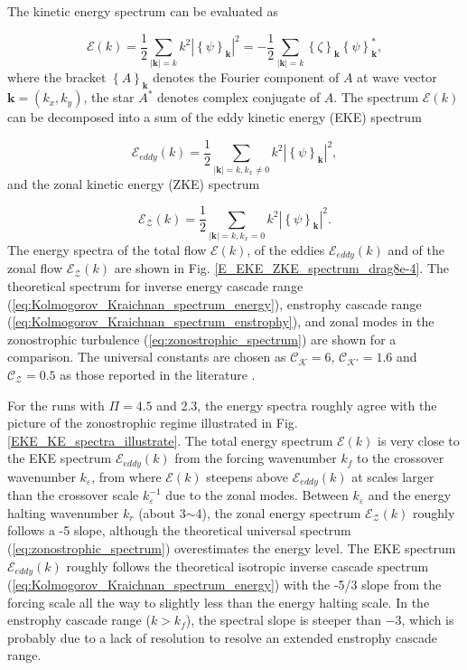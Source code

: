 \documentclass{ametsoc}
\begin{document}
The kinetic energy spectrum can be evaluated as

\begin{equation}
\mathcal{E}(k)=\frac{1}{2}\underset{|\mathbf{k}|=k}{\sum}k^{2}|\left\{ \psi\right\} _{\mathbf{k}}|^{2}=-\frac{1}{2}\underset{|\mathbf{k}|=k}{\sum}\left\{ \zeta\right\} _{\mathbf{k}}\left\{ \psi\right\} _{\mathbf{k}}^{*},\label{eq:energy_spectrum_psi_zeta}
\end{equation}
where the bracket $\left\{ A\right\} _{\mathbf{k}}$ denotes the Fourier
component of $A$ at wave vector $\mathbf{k}=(k_{x},k_{y})$, the
star $A^{*}$ denotes complex conjugate of $A$. The spectrum $\mathcal{E}(k)$
can be decomposed into a sum of the eddy kinetic energy (EKE) spectrum

\begin{equation}
\mathcal{E}_{eddy}(k)=\frac{1}{2}\underset{|\mathbf{k}|=k,k_{x}\neq0}{\sum}k^{2}|\left\{ \psi\right\} _{\mathbf{k}}|^{2},\label{eq:EKE_spec_psi}
\end{equation}
and the zonal kinetic energy (ZKE) spectrum

\begin{equation}
\mathcal{E}_{\mathcal{Z}}(k)=\frac{1}{2}\underset{|\mathbf{k}|=k,k_{x}=0}{\sum}k^{2}|\left\{ \psi\right\} _{\mathbf{k}}|^{2}.\label{eq:ZKE_spec_psi}
\end{equation}
The energy spectra of the total flow $\mathcal{E}(k)$, of the eddies
$\mathcal{E}_{eddy}(k)$ and of the zonal flow $\mathcal{E}_{\mathcal{Z}}(k)$
are shown in Fig. \ref{E_EKE_ZKE_spectrum_drag8e-4}. The theoretical
spectrum for inverse energy cascade range (\ref{eq:Kolmogorov_Kraichnan_spectrum_energy}),
enstrophy cascade range (\ref{eq:Kolmogorov_Kraichnan_spectrum_enstrophy}),
and zonal modes in the zonostrophic turbulence (\ref{eq:zonostrophic_spectrum})
are shown for a comparison. The universal constants are chosen as
$\mathcal{C_{K}}=6$, $\mathcal{C}_{\mathcal{K}'}=1.6$ and $\mathcal{C_{Z}}=0.5$
as those reported in the literature \citep{Boffetta2012,Galperin2010}.

For the runs with $\Pi=4.5$ and 2.3, the energy spectra roughly agree
with the picture of the zonostrophic regime illustrated in Fig. \ref{EKE_KE_spectra_illustrate}.
The total energy spectrum $\mathcal{E}(k)$ is very close to the EKE
spectrum $\mathcal{E}_{eddy}(k)$ from the forcing wavenumber $k_{f}$
to the crossover wavenumber $k_{\varepsilon}$, from where $\mathcal{E}(k)$
steepens above $\mathcal{E}_{eddy}(k)$ at scales larger than the
crossover scale $k_{\varepsilon}^{-1}$ due to the zonal modes. Between
$k_{\varepsilon}$ and the energy halting wavenumber $k_{r}$ (about
3$\sim$4), the zonal energy spectrum $\mathcal{E}_{\mathcal{Z}}(k)$
roughly follows a -5 slope, although the theoretical universal spectrum
(\ref{eq:zonostrophic_spectrum}) overestimates the energy level.
The EKE spectrum $\mathcal{E}_{eddy}(k)$ roughly follows the theoretical
isotropic inverse cascade spectrum (\ref{eq:Kolmogorov_Kraichnan_spectrum_energy})
with the -5/3 slope from the forcing scale all the way to slightly
less than the energy halting scale. In the enstrophy cascade range
($k>k_{f}$), the spectral slope is steeper than $-3$, which is probably
due to a lack of resolution to resolve an extended enstrophy cascade
range.
\end{document}
